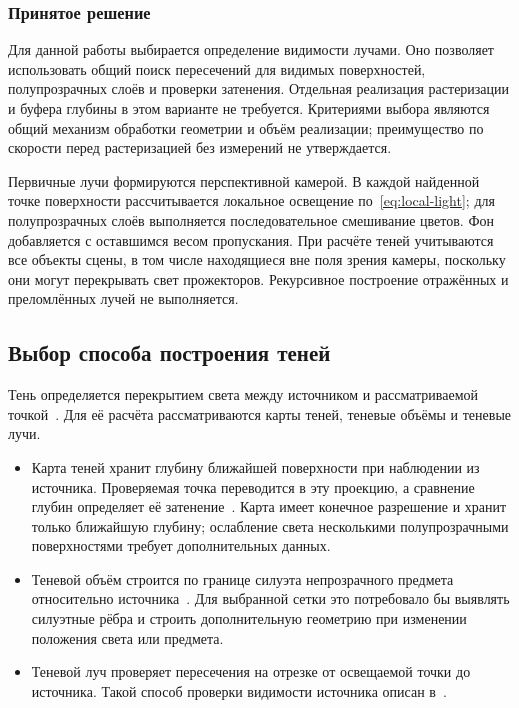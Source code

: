 \subsubsection{Принятое решение}

Для данной работы выбирается определение видимости лучами. Оно позволяет использовать общий поиск пересечений для видимых поверхностей, полупрозрачных слоёв и проверки затенения. Отдельная реализация растеризации и буфера глубины в этом варианте не требуется. Критериями выбора являются общий механизм обработки геометрии и объём реализации; преимущество по скорости перед растеризацией без измерений не утверждается.

Первичные лучи формируются перспективной камерой. В каждой найденной точке поверхности рассчитывается локальное освещение по~\eqref{eq:local-light}; для полупрозрачных слоёв выполняется последовательное смешивание цветов. Фон добавляется с оставшимся весом пропускания. При расчёте теней учитываются все объекты сцены, в том числе находящиеся вне поля зрения камеры, поскольку они могут перекрывать свет прожекторов. Рекурсивное построение отражённых и преломлённых лучей не выполняется.

\subsection{Выбор способа построения теней}
\label{subsec:shadows}

Тень определяется перекрытием света между источником и рассматриваемой точкой~\cite[разд.~1.2.4]{pbrt4}. Для её расчёта рассматриваются карты теней, теневые объёмы и теневые лучи.

\begin{itemize}
  \item Карта теней хранит глубину ближайшей поверхности при наблюдении из источника. Проверяемая точка переводится в эту проекцию, а сравнение глубин определяет её затенение~\cite{williams1978}. Карта имеет конечное разрешение и хранит только ближайшую глубину; ослабление света несколькими полупрозрачными поверхностями требует дополнительных данных.
  \item Теневой объём строится по границе силуэта непрозрачного предмета относительно источника~\cite{crow1977}. Для выбранной сетки это потребовало бы выявлять силуэтные рёбра и строить дополнительную геометрию при изменении положения света или предмета.
  \item Теневой луч проверяет пересечения на отрезке от освещаемой точки до источника. Такой способ проверки видимости источника описан в~\cite[разд.~1.2.4]{pbrt4}.
\end{itemize}

